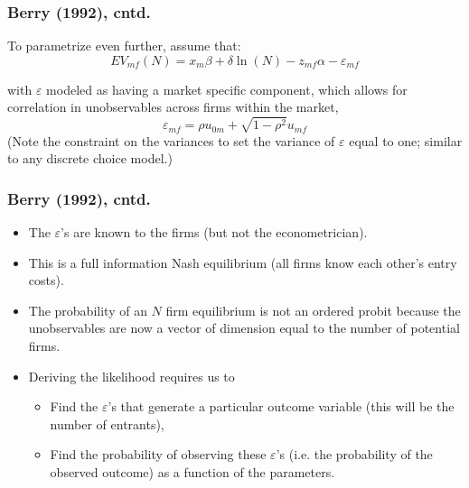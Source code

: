 \begin{frame}
\frametitle{Berry (1992), cntd.}
To parametrize even further, assume that:\ \ 
\begin{equation}
EV_{mf}(N)=x_{m}\beta +\delta \ln (N)-z_{mf}\alpha -\varepsilon _{mf}
\label{entry6}
\end{equation}

with $\varepsilon $ modeled as having a market specific component, which
allows for correlation in unobservables across firms within the market, 
\begin{equation*}
\varepsilon _{mf}=\rho u_{0m}+\sqrt{1-\rho ^{2}}u_{mf}
\end{equation*}
(Note the constraint on the variances to set the variance of $\varepsilon $
equal to one; similar to any discrete choice model.)
\end{frame}
\begin{frame}

\frametitle{Berry (1992), cntd.}
\begin{itemize}
\item The $\varepsilon $'s are known to the firms (but not the
econometrician).

\item This is a full information Nash equilibrium (all firms know each
other's entry costs).

\item The probability of an $N$ firm equilibrium is not an ordered probit
because the unobservables are now a vector of dimension equal to the number
of potential firms.

\item Deriving the likelihood requires us to

\begin{itemize}
\item Find the $\varepsilon $'s that generate a particular outcome variable
(this will be the number of entrants),

\item Find the probability of observing these $\varepsilon $'s (i.e. the
probability of the observed outcome) as a function of the parameters.
\end{itemize}
\end{itemize}

\end{frame}
